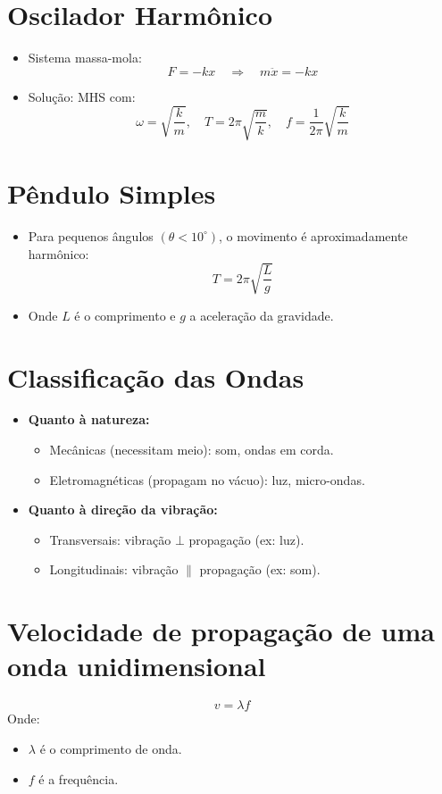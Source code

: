 \documentclass[a4paper,12pt]{article}
\begin{document}
\begin{multicols}{2}
\section{Oscilador Harmônico}
\begin{itemize}
    \item Sistema massa-mola:
    \[
        F = -kx \quad \Rightarrow \quad m\ddot{x} = -kx
    \]
    \item Solução: MHS com:
    \[
        \omega = \sqrt{\frac{k}{m}}, \quad T = 2\pi\sqrt{\frac{m}{k}}, \quad f = \frac{1}{2\pi}\sqrt{\frac{k}{m}}
    \]
\end{itemize}

\section{Pêndulo Simples}
\begin{itemize}
    \item Para pequenos ângulos $(\theta < 10^\circ)$, o movimento é aproximadamente harmônico:
    \[
        T = 2\pi \sqrt{\frac{L}{g}}
    \]
    \item Onde $L$ é o comprimento e $g$ a aceleração da gravidade.
\end{itemize}

\section{Classificação das Ondas}
\begin{itemize}
    \item \textbf{Quanto à natureza:}
    \begin{itemize}
        \item Mecânicas (necessitam meio): som, ondas em corda.
        \item Eletromagnéticas (propagam no vácuo): luz, micro-ondas.
    \end{itemize}
    \item \textbf{Quanto à direção da vibração:}
    \begin{itemize}
        \item Transversais: vibração $\bot$ propagação (ex: luz).
        \item Longitudinais: vibração $\|$ propagação (ex: som).
    \end{itemize}
\end{itemize}

\section{Velocidade de propagação de uma onda unidimensional}
\[
    v = \lambda f
\]
Onde:
\begin{itemize}
    \item $\lambda$ é o comprimento de onda.
    \item $f$ é a frequência.
\end{itemize}


\end{multicols}
\end{document}
